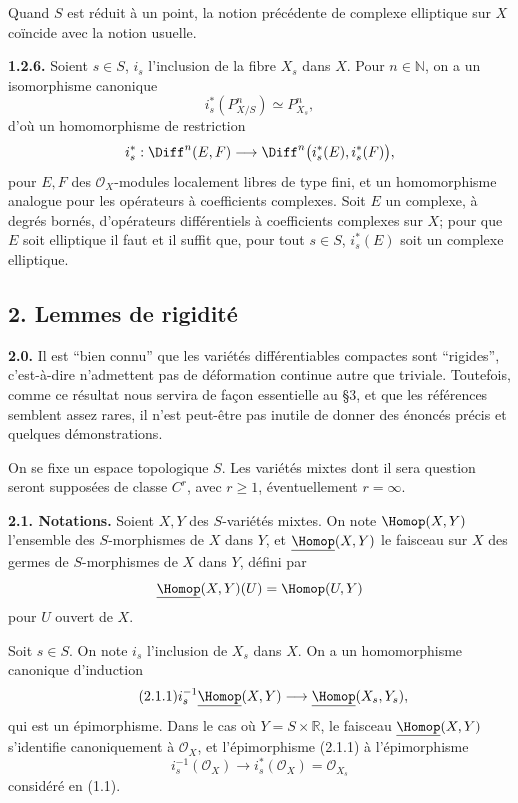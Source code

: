 \documentclass[11pt]{article}
\providecommand{\cO}{\mathcal O}
\providecommand{\R}{\mathbb R}
\providecommand{\N}{\mathbb N}
\begin{document}
Quand $S$ est réduit à un point, la notion précédente de complexe elliptique sur $X$ coïncide avec la notion usuelle.

\textbf{1.2.6.} Soient $s\in S$, $i_s$ l'inclusion de la fibre $X_s$ dans $X$. Pour $n\in\N$, on a un isomorphisme canonique
\[
  i_s^*(P^n_{X/S})\simeq P^n_{X_s},
\]
d'où un homomorphisme de restriction
\[
  i_s^*:\Diff^n(E,F)
  \longrightarrow
  \Diff^n\bigl(i_s^*(E),i_s^*(F)\bigr),
\]
pour $E,F$ des $\cO_X$-modules localement libres de type fini, et un homomorphisme analogue pour les opérateurs à coefficients complexes. Soit $E$ un complexe, à degrés bornés, d'opérateurs différentiels à coefficients complexes sur $X$; pour que $E$ soit elliptique il faut et il suffit que, pour tout $s\in S$, $i_s^*(E)$ soit un complexe elliptique.

\subsection*{2. Lemmes de rigidité}

\textbf{2.0.} Il est ``bien connu'' que les variétés différentiables compactes sont ``rigides'', c'est-à-dire n'admettent pas de déformation continue autre que triviale. Toutefois, comme ce résultat nous servira de façon essentielle au §3, et que les références semblent assez rares, il n'est peut-être pas inutile de donner des énoncés précis et quelques démonstrations.

On se fixe un espace topologique $S$. Les variétés mixtes dont il sera question seront supposées de classe $C^r$, avec $r\ge1$, éventuellement $r=\infty$.

\textbf{2.1. Notations.} Soient $X,Y$ des $S$-variétés mixtes. On note $\Homop(X,Y)$ l'ensemble des $S$-morphismes de $X$ dans $Y$, et $\underline{\Homop}(X,Y)$ le faisceau sur $X$ des germes de $S$-morphismes de $X$ dans $Y$, défini par
\[
  \underline{\Homop}(X,Y)(U)=\Homop(U,Y)
\]
pour $U$ ouvert de $X$.

Soit $s\in S$. On note $i_s$ l'inclusion de $X_s$ dans $X$. On a un homomorphisme canonique d'induction
\begin{equation}\tag{2.1.1}
  i_s^{-1}\underline{\Homop}(X,Y)
  \longrightarrow
  \underline{\Homop}(X_s,Y_s),
\end{equation}
qui est un épimorphisme. Dans le cas où $Y=S\times\R$, le faisceau $\underline{\Homop}(X,Y)$ s'identifie canoniquement à $\cO_X$, et l'épimorphisme (2.1.1) à l'épimorphisme
\[
  i_s^{-1}(\cO_X)\longrightarrow i_s^*(\cO_X)=\cO_{X_s}
\]
considéré en (1.1).
\end{document}
